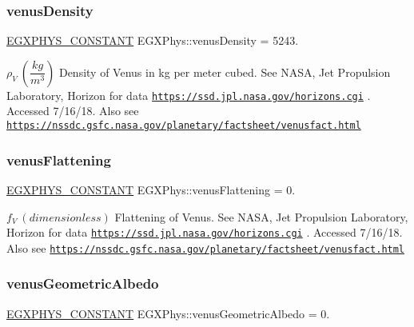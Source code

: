 \subsubsection{\texorpdfstring{venus\+Density}{venusDensity}}
{\footnotesize\ttfamily \mbox{\hyperlink{group___e_g_x_phys-_constants-_macros_ga76980d288494ce1714c9ac68a95ba702}{E\+G\+X\+P\+H\+Y\+S\+\_\+\+C\+O\+N\+S\+T\+A\+NT}} E\+G\+X\+Phys\+::venus\+Density = 5243.}

$\rho_{V} \ (\dfrac{kg}{m^3})$ Density of Venus in kg per meter cubed. See N\+A\+SA, Jet Propulsion Laboratory, Horizon for data \href{https://ssd.jpl.nasa.gov/horizons.cgi}{\tt https\+://ssd.\+jpl.\+nasa.\+gov/horizons.\+cgi} . Accessed 7/16/18. Also see \href{https://nssdc.gsfc.nasa.gov/planetary/factsheet/venusfact.html}{\tt https\+://nssdc.\+gsfc.\+nasa.\+gov/planetary/factsheet/venusfact.\+html} \mbox{\label{group___e_g_x_phys-_constants-_astrophysics-_solar_system-_venus-_bulk_ga1fa2321d7cd6c55bc48dc191719d580d}} 
\subsubsection{\texorpdfstring{venus\+Flattening}{venusFlattening}}
{\footnotesize\ttfamily \mbox{\hyperlink{group___e_g_x_phys-_constants-_macros_ga76980d288494ce1714c9ac68a95ba702}{E\+G\+X\+P\+H\+Y\+S\+\_\+\+C\+O\+N\+S\+T\+A\+NT}} E\+G\+X\+Phys\+::venus\+Flattening = 0.}

$f_{V} \ (dimensionless)$ Flattening of Venus. See N\+A\+SA, Jet Propulsion Laboratory, Horizon for data \href{https://ssd.jpl.nasa.gov/horizons.cgi}{\tt https\+://ssd.\+jpl.\+nasa.\+gov/horizons.\+cgi} . Accessed 7/16/18. Also see \href{https://nssdc.gsfc.nasa.gov/planetary/factsheet/venusfact.html}{\tt https\+://nssdc.\+gsfc.\+nasa.\+gov/planetary/factsheet/venusfact.\+html} \mbox{\label{group___e_g_x_phys-_constants-_astrophysics-_solar_system-_venus-_bulk_ga96509772a8eb0fd6d6dae81ea65505ed}} 
\subsubsection{\texorpdfstring{venus\+Geometric\+Albedo}{venusGeometricAlbedo}}
{\footnotesize\ttfamily \mbox{\hyperlink{group___e_g_x_phys-_constants-_macros_ga76980d288494ce1714c9ac68a95ba702}{E\+G\+X\+P\+H\+Y\+S\+\_\+\+C\+O\+N\+S\+T\+A\+NT}} E\+G\+X\+Phys\+::venus\+Geometric\+Albedo = 0.}

